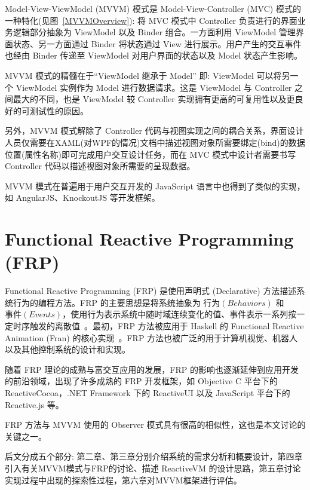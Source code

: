 Model-View-ViewModel (MVVM) 模式是 Model-View-Controller (MVC) 模式的一种特化(见图~\ref{MVVMOverview}): 将 MVC 模式中 Controller 负责进行的界面业务逻辑部分抽象为 ViewModel 以及 Binder 组合。一方面利用 ViewModel 管理界面状态、另一方面通过 Binder 将状态通过 View 进行展示。用户产生的交互事件也经由 Binder 传递至 ViewModel 对用户界面的状态以及 Model 状态产生影响。

MVVM 模式的精髓在于“ViewModel 继承于 Model” 即: ViewModel 可以将另一个 ViewModel 实例作为 Model 进行数据请求。这是 ViewModel 与 Controller 之间最大的不同，也是 ViewModel 较 Controller 实现拥有更高的可复用性以及更良好的可测试性的原因。

另外，MVVM 模式解除了 Controller 代码与视图实现之间的耦合关系，界面设计人员仅需要在XAML(对WPF的情况)文档中描述视图对象所需要绑定(bind)的数据位置(属性名称)即可完成用户交互设计任务，而在 MVC 模式中设计者需要书写 Controller 代码以描述视图对象所需要的呈现数据。

MVVM 模式在普遍用于用户交互开发的 JavaScript 语言中也得到了类似的实现，如 AngularJS、KnockoutJS 等开发框架。

\section{Functional Reactive Programming (FRP)}

Functional Reactive Programming (FRP) 是使用声明式 (Declarative) 方法描述系统行为的编程方法。FRP 的主要思想是将系统抽象为 $行为(Behaviors)$ 和 $事件(Events)$，使用行为表示系统中随时域连续变化的值、事件表示一系列按一定时序触发的离散值~\cite{Wan:2000:FRP:358438.349331}。最初，FRP 方法被应用于 Haskell 的 Functional Reactive Animation (Fran) 的核心实现~\cite{Elliott:1997:FRA:258949.258973}。FRP 方法也被广泛的用于计算机视觉、机器人以及其他控制系统的设计和实现。

随着 FRP 理论的成熟与富交互应用的发展，FRP 的影响也逐渐延伸到应用开发的前沿领域，出现了许多成熟的 FRP 开发框架，如 Objective C 平台下的 ReactiveCocoa，.NET Framework 下的 ReactiveUI 以及 JavaScript 平台下的 Reactive.js 等。

FRP 方法与 MVVM 使用的 Observer 模式具有很高的相似性，这也是本文讨论的关键之一。

后文分成五个部分: 第二章、第三章分别介绍系统的需求分析和概要设计，第四章引入有关MVVM模式与FRP的讨论、描述 ReactiveVM 的设计思路，第五章讨论实现过程中出现的探索性过程，第六章对MVVM框架进行评估。

